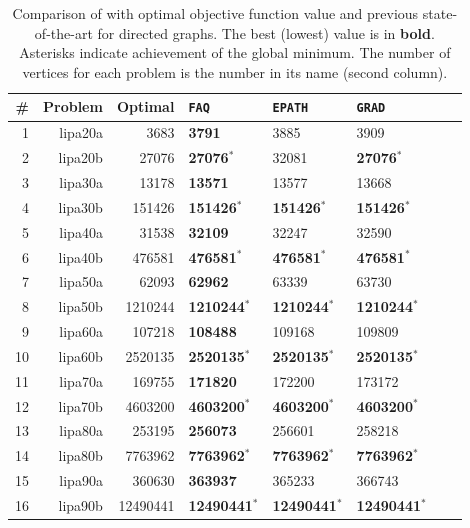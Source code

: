 \documentclass[11pt]{article}
\begin{document}
\begin{table}[h!]
\caption{Comparison of \FAQ with optimal objective function value and previous state-of-the-art for directed graphs.  The best (lowest) value is in \textbf{bold}. Asterisks indicate achievement of the global minimum.  The number of vertices for each problem is the number in its name (second column).}
\begin{center}
\begin{tabular}{|r|r|r||l|l|l|l|l|}
	\hline 
	          \# &  Problem &      Optimal & \texttt{FAQ} & \texttt{EPATH} & \texttt{GRAD} \\
	\hline 
	           1 &  lipa20a &     3683 & \textbf{3791} &     3885 &     3909 \\ 
	           2 &  lipa20b &    27076 & \textbf{27076}$^*$ &    32081 &    \textbf{27076}$^*$ \\ 
	           3 &  lipa30a &    13178 & \textbf{13571} 	&    13577 &    13668 \\ 
	           4 &  lipa30b &   151426 & \textbf{151426}$^*$ & \textbf{151426}$^*$ &   \textbf{151426}$^*$ \\ 
	           5 &  lipa40a &    31538 & \textbf{32109} 	&    32247 &    32590 \\ 
	           6 &  lipa40b &   476581 & \textbf{476581}$^*$ &   \textbf{476581}$^*$ &   \textbf{476581}$^*$ \\ 
	           7 &  lipa50a &    62093 & \textbf{62962} &    63339 &    63730 \\ 
	           8 &  lipa50b &  1210244 & \textbf{1210244}$^*$ &  \textbf{1210244}$^*$ &  \textbf{1210244}$^*$ \\ 
	           9 &  lipa60a &   107218 & \textbf{108488} &   109168 &   109809 \\ 
	          10 &  lipa60b &  2520135 & \textbf{2520135}$^*$ &  \textbf{2520135}$^*$ &  \textbf{2520135}$^*$ \\ 
	          11 &  lipa70a &   169755 & \textbf{171820} &   172200 &   173172 \\ 
	          12 &  lipa70b &  4603200 & \textbf{4603200}$^*$ &  \textbf{4603200}$^*$ &  \textbf{4603200}$^*$ \\ 
	          13 &  lipa80a &   253195 & \textbf{256073} &   256601 &   258218 \\ 
	          14 &  lipa80b &  7763962 & \textbf{7763962}$^*$ &  \textbf{7763962}$^*$ &  \textbf{7763962}$^*$ \\ 
	          15 &  lipa90a &   360630 & \textbf{363937} &   365233 &   366743 \\ 
	          16 &  lipa90b & 12490441 & \textbf{12490441}$^*$ & \textbf{12490441}$^*$ & \textbf{12490441}$^*$ \\ 
	\hline
	\end{tabular}
\end{center}
\label{tab:directed}
\end{table}%
\end{document}
